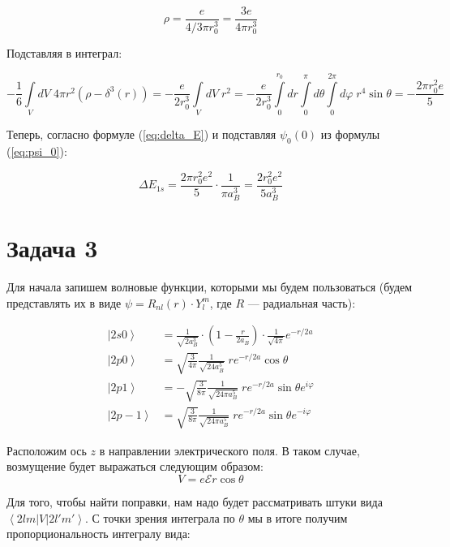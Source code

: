 \documentclass[a4paper, 12pt]{article}
\renewcommand{\phi}{\varphi} %
\newcommand{\bra}[1]
{\ensuremath{\left\langle#1\right|}}
\newcommand{\cat}[1]
{\ensuremath{\left|#1\right\rangle}}
\begin{document}
\begin{equation*}
	\rho = \frac{e}{4/3 \pi r_0^3} = \frac{3e}{4\pi r_0^3}
\end{equation*}

Подставляя в интеграл:

\begin{equation*}
	-\frac{1}{6} \int\limits_V dV \; 4\pi r^2 (\rho - \delta^3(r)) = -\frac{e}{2r_0^3}\int\limits_V dV \; r^2 = -\frac{e}{2r_0^3} \int\limits_{0}^{r_0} dr \int\limits_{0}^{\pi} d\theta \int\limits_{0}^{2\pi} d\phi \; r^4 \sin\theta = - \frac{2\pi r_0^2 e}{5}
\end{equation*}

Теперь, согласно формуле (\ref{eq:delta_E}) и подставляя $\psi_0(0)$ из формулы (\ref{eq:psi_0}):

\begin{equation*}
	\Delta E_{1s} = \frac{2\pi r_0^2 e^2}{5} \cdot \frac{1}{\pi a_B^3} = \boxed{\frac{2r_0^2 e^2}{5 a_B^3}}
\end{equation*}

\section*{Задача 3}

Для начала запишем волновые функции, которыми мы будем пользоваться (будем представлять их в виде $\psi = R_{nl}(r) \cdot Y_{l}^m$, где $R$ --- радиальная часть):

\begin{align*}
	\cat{2s0} &= \frac{1}{\sqrt{2 a_B^3}} \cdot \left(1 - \frac{r}{2a_B}\right) \cdot \frac{1}{\sqrt{4\pi}}e^{-r/2a}\\
	\cat{2p0} &= \sqrt{\frac{3}{4\pi}} \frac{1}{\sqrt{24 a_B^5}}\; r e^{-r/2a} \cos\theta\\
	\cat{2p1} &= -\sqrt{\frac{3}{8\pi}} \frac{1}{\sqrt{24 \pi a_B^5}} \; r e^{-r/2a} \sin \theta e^{i\phi}\\
	\cat{2p-1} &= \sqrt{\frac{3}{8\pi}} \frac{1}{\sqrt{24 \pi a_B^5}} \; r e^{-r/2a} \sin \theta e^{-i\phi}
\end{align*}

Расположим ось $z$ в направлении электрического поля. В таком случае, возмущение будет выражаться следующим образом:
\begin{equation*}
	V = e \mathcal{E} r \cos \theta
\end{equation*}

Для того, чтобы найти поправки, нам надо будет рассматривать штуки вида $\bra{2lm}V\cat{2l'm'}$. С точки зрения интеграла по $\theta$ мы в итоге получим пропорциональность интегралу вида:
\end{document}
